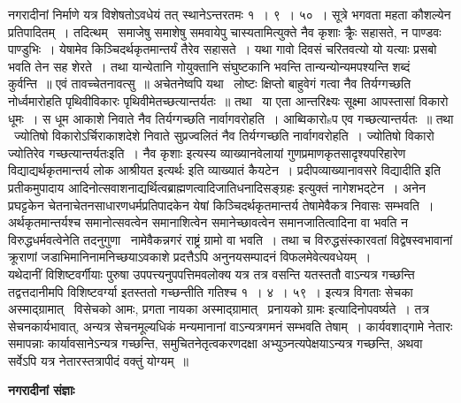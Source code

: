 \documentclass[11pt, openany]{book}
\begin{document}
नगरादीनां निर्माणे यत्र विशेषतोऽवधेयं तत् स्थानेऽन्तरतमः १~। ९~। ५०~। सूत्रे भगवता महता कौशल्येन प्रतिपादितम्~। तदित्थम् \textendash\ समाजेषु समाशेषु समवायेपु चास्यतामित्युक्ते नैव कृशाः क्रृ्ैः सहासते, न पाण्डवः पाण्डुभिः~। येषामेव किञ्चिदर्थकृतमान्तर्यं तैरेव सहासते~। यथा गावो दिवसं चरितवत्यो यो यत्याः प्रसबो भवति तेन सह शेरते~। तथा यान्येतानि गोयुक्तानि संघुष्टकानि भवन्ति तान्यन्योन्यमपश्यन्ति शब्दं कुर्वन्ति~॥ एवं तावच्चेतनावत्सु~॥ अचेतनेष्वपि यथा \textendash\ लोष्टः क्षिप्तो बाहुवेगं गत्वा नैव तिर्यग्गच्छति नोर्ध्वमारोहति पृथिवीविकारः पृथिवीमेतच्छत्यान्तर्यतः~॥ तथा \textendash\ या एता आन्तरिक्ष्यः सूक्ष्मा आपस्तासां विकारो धूमः~। स धूम आकाशे निवाते नैव तिर्यग्गच्छति नार्वागवरोहति~। आब्विकारोsप एव गच्छत्यान्तर्यतः~॥ तथा \textendash\ ज्योतिषो विकारोऽर्चिराकाशदेशे निवाते सुप्रज्वलितं नैव तिर्यग्गच्छति नार्वागवरोहति~। ज्योतिषो विकारो ज्योतिरेव गच्छत्यान्तर्यतः{\qt इति~। }नैव कृशाः इत्यस्य व्याख्यानवेलायां गुणप्रमाणकृतसादृश्यपरिहारेण विद्याद्यर्थकृतमान्तर्य लोक आश्रीयत इत्यर्थः इति व्याख्यातं कैयटेन~। प्रदीपव्याख्यानावसरे {\qt विद्यादीति} इति प्रतीकमुपादाय {\qt आदिनोत्सवाशनाद्यर्थित्वब्राह्मणत्वादिजातिधनादिसङ्ग्रहः} इत्युक्तं नागेशभद्टेन~। अनेन प्रघट्टकेन चेतनाचेतनसाधारणधर्मप्रतिपादकेन येषां किञ्चिदर्थकृतमान्तर्य तेषामेवैकत्र निवासः सम्भवति~। अर्थकृतमान्तर्यश्च समानोत्सवत्वेन समानाशित्वेन समानेच्छावत्वेन समानजातित्वादिना वा भवति न विरुद्धधर्मवत्वेनेति तदनुगुणा \textendash\ नामेवैकन्नगरं राष्ट्रं ग्रामो वा भवति~। तथा च विरुद्धसंस्कारवतां विद्वेषस्वभावानां क्रूराणां जडाभिमानिनामनिच्छयाऽवकाशे प्रदत्तैऽपि अनुनयसम्पादनं विफलमेवेत्यवधेयम्~।\\

यथेदानीं विशिष्टवर्गीयाः पुरुषा उपपत्त्यनुपपत्तिमवलोक्य यत्र तत्र वसन्ति यतस्ततौ वाऽन्यत्र गच्छन्ति तद्वत्तदानीमपि विशिष्टवर्ग्या इतस्ततो गच्छन्तीति गतिश्च १~। ४~। ५९~। इत्यत्र विगताः सेचका अस्माद्ग्रामात् \textendash\ विसेचको आमः, प्रगता नायका अस्माद्ग्रामात् \textendash\ प्रनायको ग्रामः इत्यादिनोपवर्ष्यते~। तत्र सेचनकार्यभावात्, अन्यत्र सेचनमूल्यधिकं मन्यमानानां वाऽन्यत्रगमनं सम्भवति तेषाम्~। कार्यवशाद्गामे नेतारः समापन्नाः कार्यावसानेऽन्यत्र गच्छन्ति, समुचितनेतृत्वकरणदक्षा अभ्युञ्नत्यपेक्षयाऽन्यत्र गच्छन्ति, अथवा सर्वेऽपि यत्र नेतारस्तत्रापीदं वक्तुं योग्यम्~॥

\begin{center}
\textbf{\Large नगरादीनां संज्ञाः \textendash\ }
\end{center}
\end{document}
